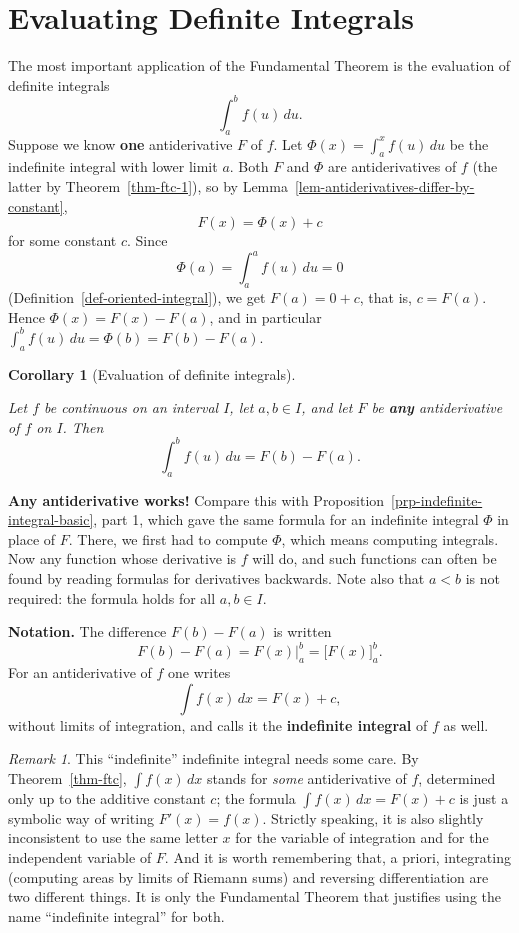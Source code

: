 \documentclass[
  letterpaper,
  DIV=11,
  numbers=noendperiod]{scrreprt}
\theoremstyle{plain}
\theoremstyle{plain}
\theoremstyle{definition}
\theoremstyle{definition}
\theoremstyle{definition}
\theoremstyle{plain}
\theoremstyle{plain}
\newtheorem{corollary}{Corollary}[chapter]
\theoremstyle{remark}
\newtheorem{refremark}{Remark}[chapter]
\begin{document}
\section{Evaluating Definite
Integrals}\label{evaluating-definite-integrals}

The most important application of the Fundamental Theorem is the
evaluation of definite integrals \[
\int_a^b f(u)\,du .
\] Suppose we know \textbf{one} antiderivative \(F\) of \(f\). Let
\(\Phi(x) = \int_a^x f(u)\,du\) be the indefinite integral with lower
limit \(a\). Both \(F\) and \(\Phi\) are antiderivatives of \(f\) (the
latter by Theorem~\ref{thm-ftc-1}), so by
Lemma~\ref{lem-antiderivatives-differ-by-constant}, \[
F(x) = \Phi(x) + c
\] for some constant \(c\). Since \[
\Phi(a) = \int_a^a f(u)\,du = 0
\] (Definition~\ref{def-oriented-integral}), we get \(F(a) = 0+c\), that
is, \(c=F(a)\). Hence \(\Phi(x) = F(x) - F(a)\), and in particular
\(\int_a^b f(u)\,du = \Phi(b) = F(b) - F(a)\).

\begin{corollary}[Evaluation of definite
integrals]\protect\hypertarget{cor-ftc-evaluation}{}\label{cor-ftc-evaluation}

Let \(f\) be continuous on an interval \(I\), let \(a,b\in I\), and let
\(F\) be \textbf{any} antiderivative of \(f\) on \(I\). Then \[
\int_a^b f(u)\,du = F(b) - F(a).
\]

\end{corollary}

\textbf{Any antiderivative works!} Compare this with
Proposition~\ref{prp-indefinite-integral-basic}, part 1, which gave the
same formula for an indefinite integral \(\Phi\) in place of \(F\).
There, we first had to compute \(\Phi\), which means computing
integrals. Now any function whose derivative is \(f\) will do, and such
functions can often be found by reading formulas for derivatives
backwards. Note also that \(a<b\) is not required: the formula holds for
all \(a,b\in I\).

\textbf{Notation.} The difference \(F(b)-F(a)\) is written \[
F(b) - F(a) = F(x)\Big|_a^b = \Big[F(x)\Big]_a^b .
\] For an antiderivative of \(f\) one writes \[
\int f(x)\,dx = F(x) + c,
\] without limits of integration, and calls it the \textbf{indefinite
integral} of \(f\) as well.

\begin{refremark}
This ``indefinite'' indefinite integral needs some care. By
Theorem~\ref{thm-ftc}, \(\int f(x)\,dx\) stands for \emph{some}
antiderivative of \(f\), determined only up to the additive constant
\(c\); the formula \(\int f(x)\,dx = F(x)+c\) is just a symbolic way of
writing \(F'(x) = f(x)\). Strictly speaking, it is also slightly
inconsistent to use the same letter \(x\) for the variable of
integration and for the independent variable of \(F\). And it is worth
remembering that, a priori, integrating (computing areas by limits of
Riemann sums) and reversing differentiation are two different things. It
is only the Fundamental Theorem that justifies using the name
``indefinite integral'' for both.

\label{rem-indefinite-notation}

\end{refremark}
\end{document}

